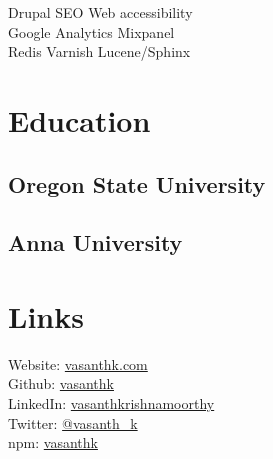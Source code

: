 \documentclass[]{my-resume-openfont}
\begin{document}
\begin{minipage}[t]{0.33\textwidth}
Drupal \textbullet{} SEO \textbullet{} Web accessibility \\
Google Analytics \textbullet{} Mixpanel \\
Redis \textbullet{} Varnish \textbullet{}  Lucene/Sphinx \\
\sectionsep


\section{Education} 

\subsection{Oregon State University}
\sectionsep

\subsection{Anna University}
\sectionsep


\section{Links} 
Website: \href{http://www.vasanthk.com}{vasanthk.com} \\
Github: \href{https://github.com/vasanthk}{vasanthk} \\
LinkedIn: \href{https://www.linkedin.com/in/vasanthkrishnamoorthy}{vasanthkrishnamoorthy} \\
Twitter: \href{https://twitter.com/vasanth_k}{@vasanth\_k} \\
npm: \href{https://www.npmjs.com/~vasanthk}{vasanthk}
\sectionsep

%
%

\end{minipage} 
\hfill
\end{document}

